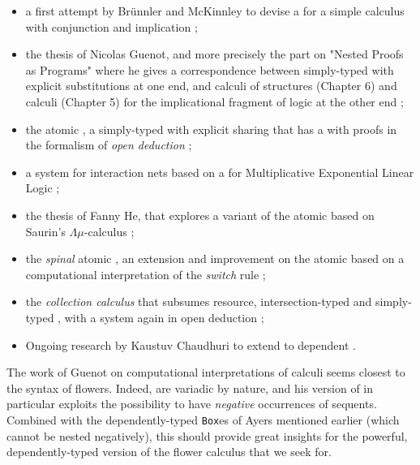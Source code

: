 \begin{itemize}
  \item a first attempt by Brünnler and McKinnley to devise a  for a simple   calculus with
  conjunction and implication ;
  \item the thesis of Nicolas Guenot, and more precisely the part on "Nested
  Proofs as Programs" where he gives a correspondence between simply-typed
   with explicit substitutions at one end, and calculi of
  structures (Chapter 6) and  calculi (Chapter 5) for the
  implicational fragment of  logic at the other end
  \cite{guenot_nested_2013};
  \item the atomic , a simply-typed  with
  explicit sharing that has a  with proofs in the
  formalism of \emph{open deduction} ;
  \item a  system for interaction nets based on a  for
  Multiplicative Exponential Linear Logic ;
  \item the thesis of Fanny He, that explores a  variant of the atomic
   based on Saurin's $\Lambda\mu$-calculus
  ;
  \item the \emph{spinal} atomic , an extension and
  improvement on the atomic  based on a computational
  interpretation of the \emph{switch} rule ;
  \item the \emph{collection calculus} that subsumes resource,
  intersection-typed and simply-typed , with a  system
  again in open deduction ;
  \item Ongoing research by Kaustuv Chaudhuri to extend  to
  dependent .
\end{itemize}
The work of Guenot on computational interpretations of  calculi
seems closest to the syntax of flowers. Indeed,  are variadic by
nature, and his version of  in particular exploits the
possibility to have \emph{negative} occurrences of sequents. Combined with the
dependently-typed \texttt{Box}es of Ayers mentioned earlier (which cannot be
nested negatively), this should provide great insights for the powerful,
dependently-typed version of the flower calculus that we seek for.

